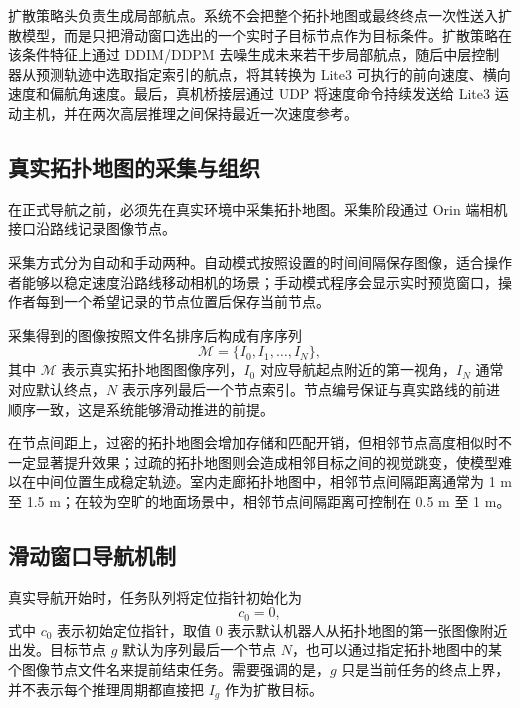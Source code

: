 扩散策略头负责生成局部航点。系统不会把整个拓扑地图或最终终点一次性送入扩散模型，而是只把滑动窗口选出的一个实时子目标节点作为目标条件。扩散策略在该条件特征上通过 DDIM/DDPM 去噪生成未来若干步局部航点，随后中层控制器从预测轨迹中选取指定索引的航点，将其转换为 Lite3 可执行的前向速度、横向速度和偏航角速度。最后，真机桥接层通过 UDP 将速度命令持续发送给 Lite3 运动主机，并在两次高层推理之间保持最近一次速度参考。

\subsection{真实拓扑地图的采集与组织}

在正式导航之前，必须先在真实环境中采集拓扑地图。采集阶段通过 Orin 端相机接口沿路线记录图像节点。

采集方式分为自动和手动两种。自动模式按照设置的时间间隔保存图像，适合操作者能够以稳定速度沿路线移动相机的场景；手动模式程序会显示实时预览窗口，操作者每到一个希望记录的节点位置后保存当前节点。

采集得到的图像按照文件名排序后构成有序序列
\begin{equation}
\mathcal{M}=\{I_0,I_1,\ldots,I_N\},
\end{equation}
其中 $\mathcal{M}$ 表示真实拓扑地图图像序列，$I_0$ 对应导航起点附近的第一视角，$I_N$ 通常对应默认终点，$N$ 表示序列最后一个节点索引。节点编号保证与真实路线的前进顺序一致，这是系统能够滑动推进的前提。

在节点间距上，过密的拓扑地图会增加存储和匹配开销，但相邻节点高度相似时不一定显著提升效果；过疏的拓扑地图则会造成相邻目标之间的视觉跳变，使模型难以在中间位置生成稳定轨迹。室内走廊拓扑地图中，相邻节点间隔距离通常为 1 m 至 1.5 m；在较为空旷的地面场景中，相邻节点间隔距离可控制在 0.5 m 至 1 m。

\subsection{滑动窗口导航机制}

真实导航开始时，任务队列将定位指针初始化为
\begin{equation}
c_0=0,
\end{equation}
式中 $c_0$ 表示初始定位指针，取值 $0$ 表示默认机器人从拓扑地图的第一张图像附近出发。目标节点 $g$ 默认为序列最后一个节点 $N$，也可以通过指定拓扑地图中的某个图像节点文件名来提前结束任务。需要强调的是，$g$ 只是当前任务的终点上界，并不表示每个推理周期都直接把 $I_g$ 作为扩散目标。

